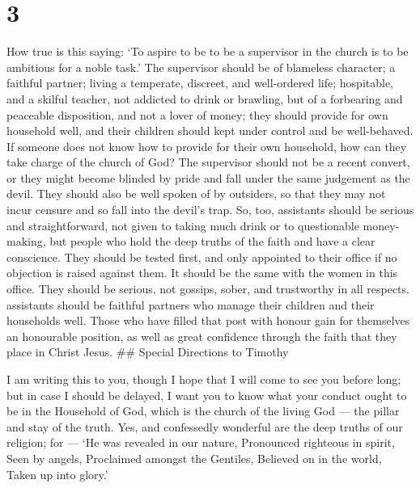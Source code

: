 \hypertarget{section-2}{%
\section{3}\label{section-2}}

 How true is this saying: `To aspire to be to be a
supervisor in the church is to be ambitious for a noble task.'
 The supervisor should be of blameless character; a faithful
partner; living a temperate, discreet, and well-ordered life;
hospitable, and a skilful teacher,  not addicted to drink or
brawling, but of a forbearing and peaceable disposition, and not a lover
of money;  they should provide for own household well, and
their children should kept under control and be well-behaved.
 If someone does not know how to provide for their own
household, how can they take charge of the church of God? 
The supervisor should not be a recent convert, or they might become
blinded by pride and fall under the same judgement as the devil.
 They should also be well spoken of by outsiders, so that
they may not incur censure and so fall into the devil's trap.
 So, too, assistants should be serious and straightforward,
not given to taking much drink or to questionable money-making,
 but people who hold the deep truths of the faith and have a
clear conscience.  They should be tested first, and only
appointed to their office if no objection is raised against them.
 It should be the same with the women in this office. They
should be serious, not gossips, sober, and trustworthy in all respects.
 assistants should be faithful partners who manage their
children and their households well.  Those who have filled
that post with honour gain for themselves an honourable position, as
well as great confidence through the faith that they place in Christ
Jesus. \#\# Special Directions to Timothy

 I am writing this to you, though I hope that I will come
to see you before long;  but in case I should be delayed, I
want you to know what your conduct ought to be in the Household of God,
which is the church of the living God --- the pillar and stay of the
truth.  Yes, and confessedly wonderful are the deep truths
of our religion; for --- `He was revealed in our nature, Pronounced
righteous in spirit, Seen by angels, Proclaimed amongst the Gentiles,
Believed on in the world, Taken up into glory.'

